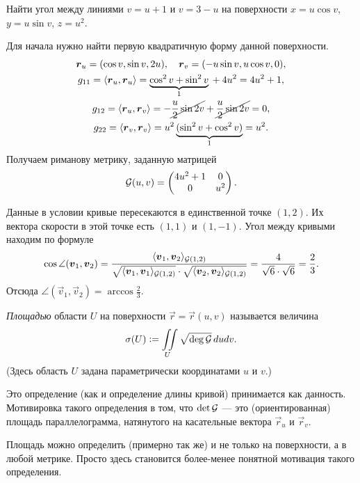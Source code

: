 \begin{problem}
	Найти угол между линиями $v = u + 1$ и $v = 3 - u$ на поверхности $x = u\cos v$, $y = u\sin v$, $z = u^2$.
\end{problem}

\begin{solution}
	Для начала нужно найти первую квадратичную форму данной поверхности.
	\begin{gather*}
		\vec{r}_u = (\cos v, \sin v, 2u),\quad \vec{r}_v = (-u\sin v, u\cos v, 0),\\
		g_{11} = \langle\vec{r}_u, \vec{r}_u\rangle = \underbrace{\cos^2v + \sin^2v}_{1} {} + 4u^2 = 4u^2 + 1,\\
		g_{12} = \langle\vec{r}_u, \vec{r}_v\rangle = -\cancel{\frac{u}{2}\sin2v} + \cancel{\frac{u}{2}\sin2v} = 0,\\
		g_{22} = \langle\vec{r}_v, \vec{r}_v\rangle = u^2\underbrace{(\sin^2v + \cos^2v)}_{1} = u^2.
	\end{gather*}
	Получаем риманову метрику, заданную матрицей
	\[
		\G(u, v) =
		\begin{pmatrix}
			4u^2 + 1 & 0\\
			0 & u^2
		\end{pmatrix}.
	\]

	Данные в условии кривые пересекаются в единственной точке $(1, 2)$. Их вектора скорости в этой точке есть $(1, 1)$ и $(1, -1)$. Угол между кривыми находим по формуле
	\[
		\cos\angle(\vec{v}_1, \vec{v}_2) = \frac{\langle\vec{v}_1, \vec{v}_2\rangle_{\G(1, 2)}}{\sqrt{\langle\vec{v}_1, \vec{v}_1\rangle_{\G(1, 2)}} \cdot \sqrt{\langle\vec{v}_2, \vec{v}_2\rangle_{\G(1, 2)}}} = \frac{4}{\sqrt{6} \cdot \sqrt{6}} = \frac{2}{3}.
	\]
	Отсюда $\angle(\vec{v}_1, \vec{v}_2) = \arccos\frac{2}{3}$.
\end{solution}

\begin{definition}
	\textit{Площадью} области $U$ на поверхности $\vec{r} = \vec{r}(u, v)$ называется величина
	\[
		\sigma(U) \vcentcolon = \iint\limits_{U}\sqrt{\deg\G}\,dudv.
	\]
	(Здесь область $U$ задана параметрически координатами $u$ и $v$.)
\end{definition}

Это определение (как и определение длины кривой) принимается как данность. Мотивировка такого определения в том, что $\det\G$ --- это (ориентированная) площадь параллелограмма, натянутого на касательные вектора $\vec{r}_u$ и $\vec{r}_v$.

Площадь можно определить (примерно так же) и не только на поверхности, а в любой метрике. Просто здесь становится более-менее понятной мотивация такого определения.

